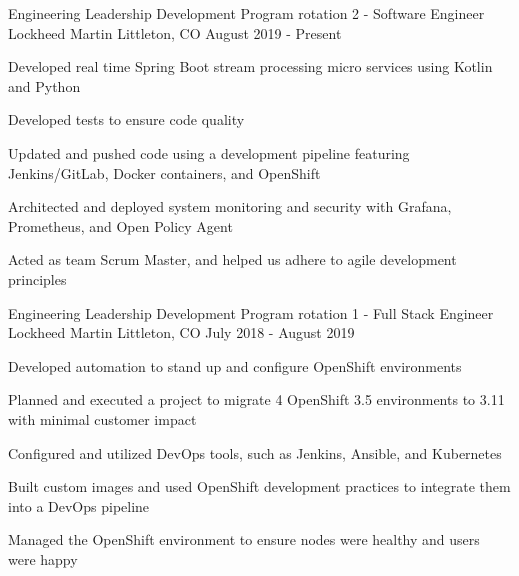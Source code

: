 


\begin{cventries}


\vspace{-.25em}
\cventry
{Engineering Leadership Development Program rotation 2 - Software Engineer} %
{Lockheed Martin} %
{Littleton, CO} %
{August 2019 - Present} %
{ %
\begin{cvitems}
\item {Developed real time Spring Boot stream processing micro services using Kotlin and Python}
\item {Developed tests to ensure code quality}
\item {Updated and pushed code using a development pipeline featuring Jenkins/GitLab, Docker containers, and OpenShift}
\item {Architected and deployed system monitoring and security with Grafana, Prometheus, and Open Policy Agent}
\item {Acted as team Scrum Master, and helped us adhere to agile development principles}
\end{cvitems}
}


\vspace{-1.25em}
\cventry
{Engineering Leadership Development Program rotation 1 - Full Stack Engineer} %
{Lockheed Martin} %
{Littleton, CO} %
{July 2018 - August 2019} %
{ %
\begin{cvitems}
\item {Developed automation to stand up and configure OpenShift environments}
\item {Planned and executed a project to migrate 4 OpenShift 3.5 environments to 3.11 with minimal customer impact}
\item {Configured and utilized DevOps tools, such as Jenkins, Ansible, and Kubernetes}
\item {Built custom images and used OpenShift development practices to integrate them into a DevOps pipeline}
\item {Managed the OpenShift environment to ensure nodes were healthy and users were happy}
\end{cvitems}
}


\end{cventries}
